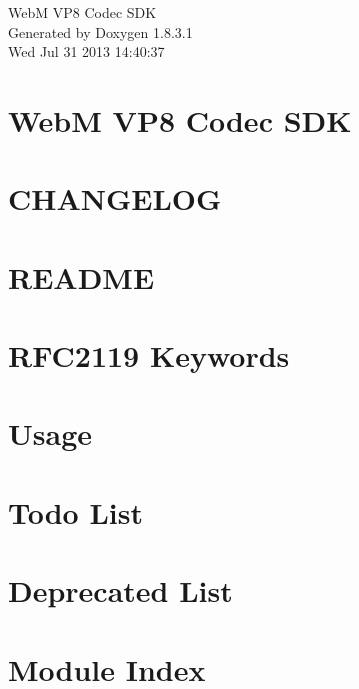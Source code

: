 \documentclass{article}
\begin{document}
\hypersetup{pageanchor=false,citecolor=blue}
\begin{titlepage}
\vspace*{7cm}
\begin{center}
{\Large Web\-M V\-P8 Codec S\-D\-K }\\
\vspace*{1cm}
{\large Generated by Doxygen 1.8.3.1}\\
\vspace*{0.5cm}
{\small Wed Jul 31 2013 14:40:37}\\
\end{center}
\end{titlepage}
\tableofcontents
{}
\hypersetup{pageanchor=true,citecolor=blue}
\section{Web\-M V\-P8 Codec S\-D\-K}
\label{index}\hypertarget{index}{}
\section{C\-H\-A\-N\-G\-E\-L\-O\-G}
\label{changelog}
\hypertarget{changelog}{}

\section{R\-E\-A\-D\-M\-E}
\label{readme}
\hypertarget{readme}{}

\section{R\-F\-C2119 Keywords}
\label{rfc2119}
\hypertarget{rfc2119}{}

\section{Usage}
\label{usage}
\hypertarget{usage}{}

\section{Todo List}
\label{todo}
\hypertarget{todo}{}

\section{Deprecated List}
\label{deprecated}
\hypertarget{deprecated}{}

\section{Module Index}

\end{document}
